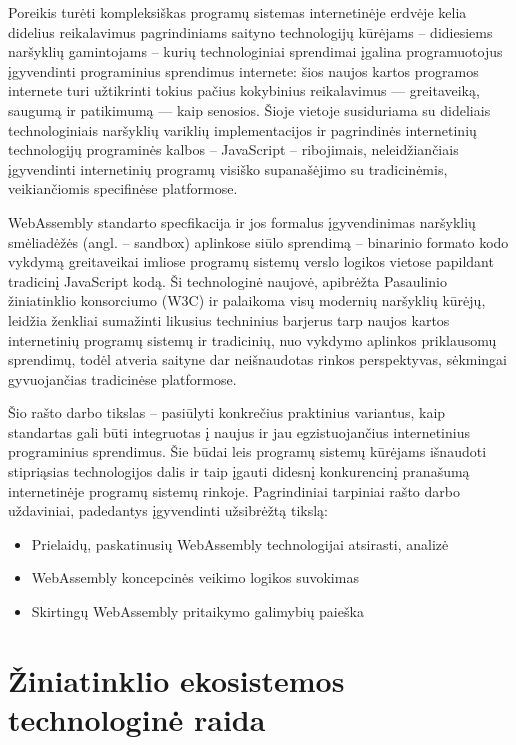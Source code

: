 \documentclass{VUMIFPSkursinis}
\begin{document}
Poreikis turėti kompleksiškas programų sistemas internetinėje erdvėje kelia didelius 
reikalavimus pagrindiniams saityno technologijų kūrėjams – didiesiems naršyklių gamintojams – 
kurių technologiniai sprendimai įgalina programuotojus įgyvendinti programinius sprendimus 
internete: šios naujos kartos programos internete turi užtikrinti tokius pačius kokybinius 
reikalavimus — greitaveiką, saugumą ir patikimumą — kaip senosios. Šioje vietoje susiduriama 
su dideliais technologiniais naršyklių variklių implementacijos ir pagrindinės internetinių 
technologijų programinės kalbos – JavaScript – ribojimais, neleidžiančiais įgyvendinti 
internetinių programų visiško supanašėjimo su tradicinėmis, veikiančiomis specifinėse 
platformose. 

WebAssembly standarto specfikacija ir jos formalus įgyvendinimas naršyklių 
smėliadėžės (angl. – sandbox) aplinkose siūlo sprendimą – binarinio formato kodo vykdymą 
greitaveikai imliose programų sistemų verslo logikos vietose papildant tradicinį JavaScript 
kodą. Ši technologinė naujovė, apibrėžta Pasaulinio žiniatinklio konsorciumo (W3C) ir palaikoma
visų modernių naršyklių kūrėjų, leidžia ženkliai sumažinti likusius techninius barjerus tarp 
naujos kartos internetinių programų sistemų ir tradicinių, nuo vykdymo aplinkos priklausomų 
sprendimų, todėl atveria saityne dar neišnaudotas rinkos perspektyvas, sėkmingai gyvuojančias
tradicinėse platformose. 

Šio rašto darbo tikslas – pasiūlyti konkrečius praktinius variantus, kaip standartas 
gali būti integruotas į naujus ir jau egzistuojančius internetinius programinius sprendimus. 
Šie būdai leis programų sistemų kūrėjams išnaudoti stipriąsias technologijos dalis ir taip 
įgauti didesnį konkurencinį pranašumą internetinėje programų sistemų rinkoje. Pagrindiniai tarpiniai rašto darbo uždaviniai, padedantys įgyvendinti užsibrėžtą tikslą:
\begin{itemize}
    \item Prielaidų, paskatinusių WebAssembly technologijai atsirasti, analizė
    \item WebAssembly koncepcinės veikimo logikos suvokimas
    \item Skirtingų WebAssembly pritaikymo galimybių paieška
\end{itemize}

\section{Žiniatinklio ekosistemos technologinė raida}
\end{document}
